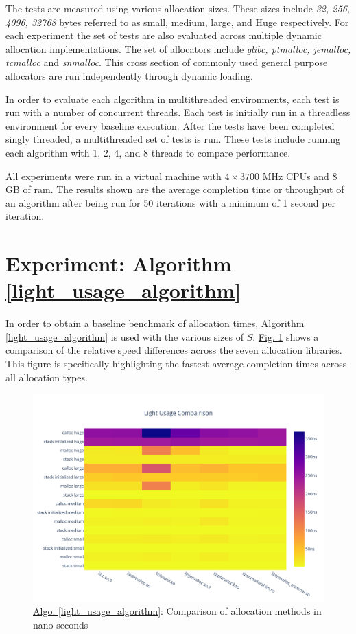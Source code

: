 \documentclass[letterpaper, 10 pt, conference]{ieeeconf}  %
\begin{document}
The tests are measured using various allocation sizes.
These sizes include \textit{32, 256, 4096, 32768} bytes referred to as small, medium, large, and Huge respectively.
For each experiment the set of tests are also evaluated across multiple dynamic allocation implementations.
The set of allocators include \textit{glibc, ptmalloc, jemalloc, tcmalloc} and \textit{snmalloc}. %
This cross section of commonly used general purpose allocators are run independently through dynamic loading.

In order to evaluate each algorithm in multithreaded environments, each test is run with a number of concurrent threads.
Each test is initially run in a threadless environment for every baseline execution.
After the tests have been completed singly threaded, a multithreaded set of tests is run.
These tests include running each algorithm with 1, 2, 4, and 8 threads to compare performance.

All experiments were run in a virtual machine with $4 \times 3700$ MHz CPUs and $8$GB of ram.
The results shown are the average completion time or throughput of an algorithm after being run for 50 iterations with a minimum of 1 second per iteration.

\section{Experiment: Algorithm \ref*{light_usage_algorithm}}
In order to obtain a baseline benchmark of allocation times, \hyperref[light_usage_algorithm]{Algorithm \ref*{light_usage_algorithm}} is used with the various sizes of $S$.
\hyperref[algo1_complete_hist]{Fig. \ref*{algo1_complete_hist}} shows a comparison of the relative speed differences across the seven allocation libraries.
This figure is specifically highlighting the fastest average completion times across all allocation types.

\begin{figure}[tbh!]
  \centering
  \includegraphics[width=\columnwidth]{graphs/light_hist.png}
  \caption{ \hyperref[light_usage_algorithm]{Algo. \ref*{light_usage_algorithm}}: Comparison of allocation methods in nano seconds }
  \label{algo1_complete_hist}
\end{figure} 
\end{document}
